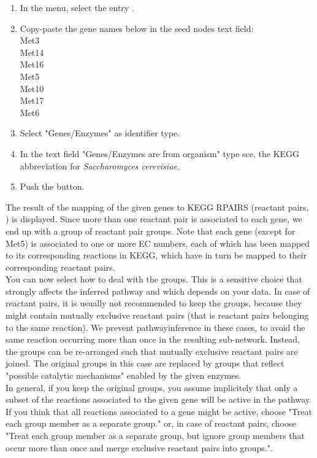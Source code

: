 \begin{enumerate}

\item In the \neat  menu, select the entry .

\item Copy-paste the gene names below in the seed nodes text field:\\
Met3\\
Met14\\
Met16\\
Met5\\
Met10\\
Met17\\
Met6

\item Select "Genes/Enzymes" as identifier type.

\item In the text field "Genes/Enzymes are from organism" type sce, the KEGG abbreviation for \textit{Saccharomyces cerevisiae}.

\item Push the  button.

\end{enumerate}

The result of the mapping of the given genes to KEGG RPAIRS (reactant pairs, \cite{Kotera2004}) is displayed.
Since more than one reactant pair is associated to each gene, we end up with a group of reactant pair groups.
Note that each gene (except for Met5) is associated to one or more EC numbers, each of which has been mapped
to its corresponding reactions in KEGG, which have in turn be mapped to their corresponding reactant pairs.\\

You can now select how to deal with the groups. This is a sensitive choice that strongly
affects the inferred pathway and which depends on your data.
In case of reactant pairs, it is usually not recommended to keep the groups, because
they might contain mutually exclusive reactant pairs (that is reactant pairs belonging to the same reaction).
We prevent pathwayinference in these cases, to avoid the same reaction occurring more than once in the resulting sub-network.
Instead, the groups can be re-arranged such that mutually exclusive reactant pairs are joined.
The original groups in this case are replaced by groups that reflect
"possible catalytic mechanisms" enabled by the given enzymes.\\
In general, if you keep the original groups, you assume implicitely that only
a subset of the reactions associated to the given gene will be active in the pathway.
If you think that all reactions associated to a gene might be active, choose "Treat each group member as a separate group." or,
in case of reactant pairs, choose "Treat each group member as a separate group, but ignore group members that occur more than once and merge exclusive reactant pairs into groups.".\\

